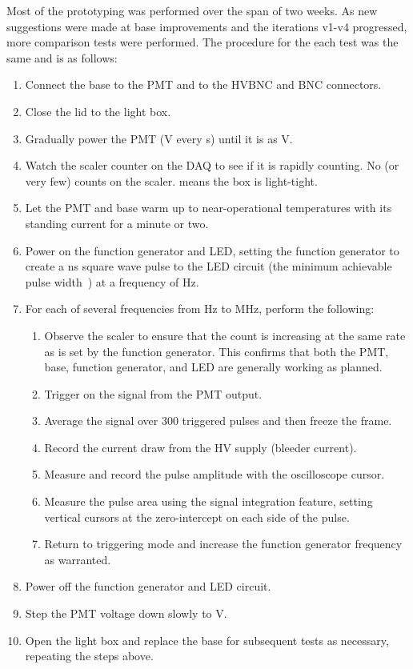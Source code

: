 Most of the prototyping was performed over the span of two weeks. As new suggestions were made at base improvements and the iterations v1-v4 progressed, more comparison tests were performed. The procedure for the each test was the same and is as follows:
\begin{enumerate}[itemsep=-1ex]
	\item Connect the base to the PMT and to the HVBNC and BNC connectors.
	\item Close the lid to the light box.
	\item Gradually power the PMT (\unit[-250]{V} every \unit[5]{s}) until it is as \unit[-1500]{V}.
	\item Watch the scaler counter on the DAQ to see if it is rapidly counting. No (or very few) counts on the scaler. means the box is light-tight.
	\item Let the PMT and base warm up to near-operational temperatures with its standing current for a minute or two.
	\item Power on the function generator and LED, setting the function generator to create a \unit[16]{ns} square wave pulse to the LED circuit (the minimum achievable pulse width~\cite{agilent:33520}) at a frequency of \unit[10]{Hz}.
	\item For each of several frequencies from \unit[10]{Hz} to \unit[30]{MHz}, perform the following:
	\begin{enumerate}[itemsep=-1ex]
		\item Observe the scaler to ensure that the count is increasing at the same rate as is set by the function generator. This confirms that both the PMT, base, function generator, and LED are generally working as planned.
		\item Trigger on the signal from the PMT output.
		\item Average the signal over 300 triggered pulses and then freeze the frame.
		\item Record the current draw from the HV supply (bleeder current).
		\item Measure and record the pulse amplitude with the oscilloscope cursor.
		\item Measure the pulse area using the signal integration feature, setting vertical cursors at the zero-intercept on each side of the pulse.
		\item Return to triggering mode and increase the function generator frequency as warranted.
	\end{enumerate}
	\item Power off the function generator and LED circuit.
	\item Step the PMT voltage down slowly to \unit[0]{V}.
	\item Open the light box and replace the base for subsequent tests as necessary, repeating the steps above.
\end{enumerate}

